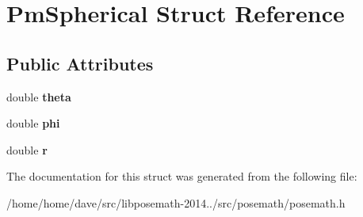 \hypertarget{structPmSpherical}{}\section{Pm\+Spherical Struct Reference}
\label{structPmSpherical}
\subsection*{Public Attributes}
\begin{DoxyCompactItemize}
\item 
\hypertarget{structPmSpherical_a478a5d41a8dcda4ae679dfb22f6bfd33}{}double {\bfseries theta}\label{structPmSpherical_a478a5d41a8dcda4ae679dfb22f6bfd33}

\item 
\hypertarget{structPmSpherical_a9945a29e9bc074dc95fb7613ed46a541}{}double {\bfseries phi}\label{structPmSpherical_a9945a29e9bc074dc95fb7613ed46a541}

\item 
\hypertarget{structPmSpherical_a7b17ba0456829680b73ec5e2a1bf3833}{}double {\bfseries r}\label{structPmSpherical_a7b17ba0456829680b73ec5e2a1bf3833}

\end{DoxyCompactItemize}


The documentation for this struct was generated from the following file\+:\begin{DoxyCompactItemize}
\item 
/home/home/dave/src/libposemath-\/2014../src/posemath/posemath.\+h\end{DoxyCompactItemize}
